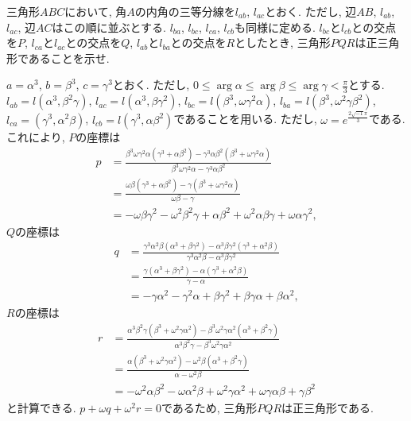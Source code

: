 \begin{bprb}[Morleyの定理]
三角形$ABC$において, 角$A$の内角の三等分線を$l_{ab}$, $l_{ac}$とおく.
ただし, 辺$AB$, $l_{ab}$, $l_{ac}$, 辺$AC$はこの順に並ぶとする.
$l_{ba}$, $l_{bc}$, $l_{ca}$, $l_{cb}$も同様に定める.
$l_{bc}$と$l_{cb}$との交点を$P$, $l_{ca}$と$l_{ac}$との交点を$Q$, $l_{ab}$と$l_{ba}$との交点を$R$としたとき, 三角形$PQR$は正三角形であることを示せ.
\end{bprb}
\begin{ifsol*}
$a=\alpha^3$, $b=\beta^3$, $c=\gamma^3$とおく.
ただし, $0\leq\arg\alpha\leq\arg\beta\leq\arg\gamma<\frac{\pi}{3}$とする.
$l_{ab}=l(\alpha^3,\beta^2\gamma)$, $l_{ac}=l(\alpha^3,\beta\gamma^2)$, $l_{bc}=l(\beta^3,\omega\gamma^2\alpha)$, $l_{ba}=l(\beta^3,\omega^2\gamma\beta^2)$, $l_{ca}=(\gamma^3,\alpha^2\beta)$, $l_{cb}=l(\gamma^3,\alpha\beta^2)$であることを用いる.
ただし, $\omega=e^{\frac{2\sqrt{-1}\pi}{3}}$である.
これにより, $P$の座標は
\begin{align*}
p
&=\frac{\beta^3\omega\gamma^2\alpha(\gamma^3+\alpha\beta^2)-\gamma^3\alpha\beta^2(\beta^3+\omega\gamma^2\alpha)}{\beta^3\omega\gamma^2\alpha-\gamma^3\alpha\beta^2}\\
&=\frac{\omega\beta(\gamma^3+\alpha\beta^2)-\gamma(\beta^3+\omega\gamma^2\alpha)}{\omega\beta-\gamma}\\
&=-\omega\beta\gamma^2-\omega^2\beta^2\gamma+\alpha\beta^2+\omega^2\alpha\beta\gamma+\omega\alpha\gamma^2,
\end{align*}
$Q$の座標は
\begin{align*}
q
&=\frac{\gamma^3\alpha^2\beta(\alpha^3+\beta\gamma^2)-\alpha^3\beta\gamma^2(\gamma^3+\alpha^2\beta)}{\gamma^3\alpha^2\beta-\alpha^3\beta\gamma^2}\\
&=\frac{\gamma(\alpha^3+\beta\gamma^2)-\alpha(\gamma^3+\alpha^2\beta)}{\gamma-\alpha}\\
&=-\gamma\alpha^2-\gamma^2\alpha+\beta\gamma^2+\beta\gamma\alpha+\beta\alpha^2,
\end{align*}
$R$の座標は
\begin{align*}
r
&=\frac{\alpha^3\beta^2\gamma(\beta^3+\omega^2\gamma\alpha^2)-\beta^3\omega^2\gamma\alpha^2(\alpha^3+\beta^2\gamma)}{\alpha^3\beta^2\gamma-\beta^3\omega^2\gamma\alpha^2}\\
&=\frac{\alpha(\beta^3+\omega^2\gamma\alpha^2)-\omega^2\beta(\alpha^3+\beta^2\gamma)}{\alpha-\omega^2\beta}\\
&=-\omega^2\alpha\beta^2-\omega\alpha^2\beta+\omega^2\gamma\alpha^2+\omega\gamma\alpha\beta+\gamma\beta^2
\end{align*}
と計算できる.
$p+\omega q+\omega^2r=0$であるため, 三角形$PQR$は正三角形である.
\end{ifsol*}